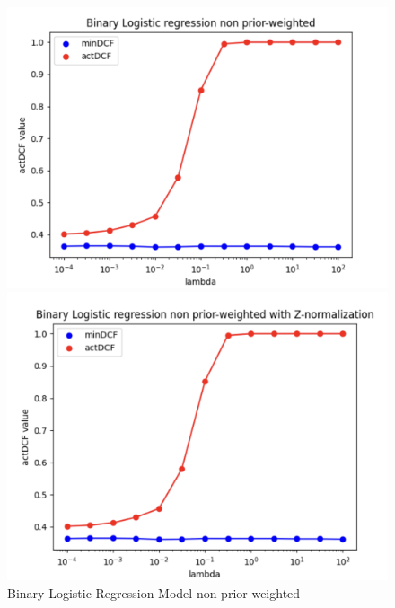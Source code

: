\documentclass{article}
\begin{document}
\begin{figure}[H]
\begin{minipage}{.27\textwidth}
        \includegraphics[width=\linewidth]{./img/LLR_noW3.png}
    \end{minipage}%
    \begin{minipage}{.27\textwidth}
        \centering
        \includegraphics[width=\linewidth]{./img/LLR_Z1.png} %
    \end{minipage}
    \caption{Binary Logistic Regression Model non prior-weighted}
    \label{fig:LLR_model}
\end{figure}
\end{document}
